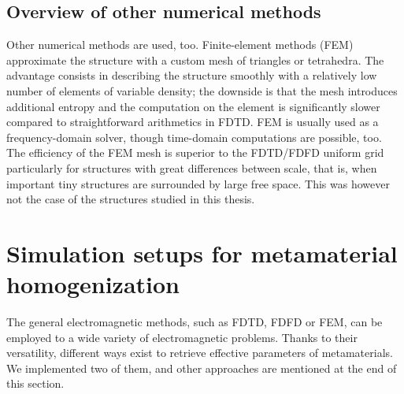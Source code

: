 \subsection{Overview of other numerical methods} %
Other numerical methods are used, too. Finite-element methods (FEM) approximate the structure with a custom mesh of triangles or tetrahedra. The advantage consists in describing the structure smoothly with a relatively low number of elements of variable density; the downside is that the mesh introduces additional entropy and the computation on the element is significantly slower compared to straightforward arithmetics in FDTD. FEM is usually used as a frequency-domain solver, though time-domain computations are possible, too. The efficiency of the FEM mesh is superior to the FDTD/FDFD uniform grid particularly for structures with great differences between scale, that is, when important tiny structures are surrounded by large free space. This was however not the case of the structures studied in this thesis.


\section{Simulation setups for metamaterial homogenization} %
The general electromagnetic methods, such as FDTD, FDFD or FEM, can be employed to a wide variety of electromagnetic problems. Thanks to their versatility, different ways exist to retrieve effective parameters of metamaterials. We implemented two of them, and other approaches are mentioned at the end of this section.
